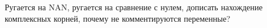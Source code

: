 
\begin{DoxyRefList}
\item[\label{todo__todo000001}%
\Hypertarget{todo__todo000001}%
File \hyperlink{main_8cpp}{main.cpp} ]Ругается на N\+AN, ругается на сравнение с нулем, дописать нахождение комплексных корней, почему не комментируются переменные? 
\end{DoxyRefList}